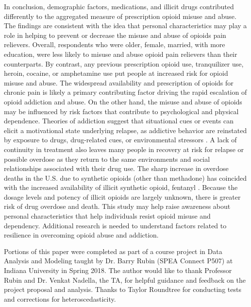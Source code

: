 \documentclass[sigconf]{acmart}
\begin{document}
In conclusion, demographic factors, medications, and illicit drugs contributed 
differently to the aggregated measure of prescription opioid misuse and abuse. 
The findings are consistent with the idea that personal characteristics may 
play a role in helping to prevent or decrease the misuse and abuse of opioids
pain relievers. Overall, respondents who were older, female, married, with more
education, were less likely to misuse and abuse opioid pain relievers than 
their counterparts. By contrast, any previous prescription opioid use, 
tranquilizer use, heroin, cocaine, or amphetamine use put people at increased 
risk for opioid misuse and abuse. The widespread availability and prescription 
of opioids for chronic pain is likely a primary contributing factor driving the 
rapid escalation of opioid addiction and abuse. On the other hand, the misuse 
and abuse of opioids may be influenced by risk factors that contribute to 
psychological and physical dependence. Theories of addiction suggest that 
situational cues or events can elicit a motivational state underlying relapse, 
as addictive behavior are reinstated by exposure to drugs, drug-related cues, or 
environmental stressors \cite{shaham03}. A lack of continuity in treatment also 
leaves many people in recovery at risk for relapse or possible overdose as they 
return to the same environments and social relationships associated with their 
drug use. The sharp increase in overdose deaths in the U.S. due to synthetic 
opioids (other than methadone) has coincided with the increased availability 
of illicit synthetic opioid, fentanyl \cite{nida17}. Because the dosage levels 
and potency of illicit opioids are largely unknown, there is greater risk of 
drug overdose and death. This study may help raise awareness about personal 
characteristics that help individuals resist opioid misuse and dependency. 
Additional research is needed to understand factors related to resilience
in overcoming opioid abuse and addiction. 



\begin{acks}

Portions of this paper were completed as part of a course project in Data 
Analysis and Modeling taught by Dr. Barry Rubin (SPEA Connect P507) at 
Indiana University in Spring 2018. The author would like to thank Professor 
Rubin and Dr. Venkat Nadella, the TA, for helpful guidance and feedback on 
the project proposal and analysis. Thanks to Taylor Roundtree for conducting
tests and corrections for heteroscedasticity.

\end{acks}

 
\end{document}
